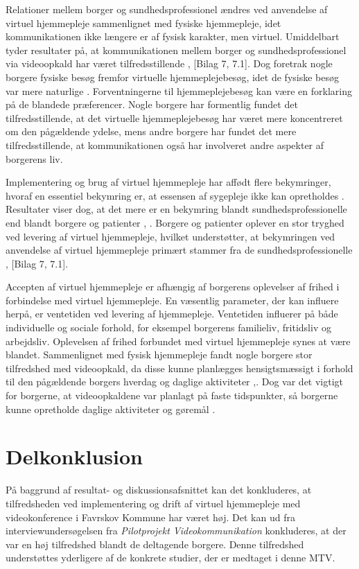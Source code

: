 Relationer mellem borger og sundhedsprofessionel ændres ved anvendelse af virtuel hjemmepleje sammenlignet med fysiske hjemmepleje, idet kommunikationen ikke længere er af fysisk karakter, men virtuel. Umiddelbart tyder resultater på, at kommunikationen mellem borger og sundhedsprofessionel via videoopkald har været tilfredsstillende \cite{Baf2}, [Bilag 7, 7.1]. Dog foretrak nogle borgere fysiske besøg fremfor virtuelle hjemmeplejebesøg, idet de fysiske besøg var mere naturlige \cite{kandidat}. 
Forventningerne til hjemmeplejebesøg kan være en forklaring på de blandede præferencer. Nogle borgere har formentlig fundet det tilfredsstillende, at det virtuelle hjemmeplejebesøg har været mere koncentreret om den pågældende ydelse, mens andre borgere har fundet det mere tilfredsstillende, at kommunikationen også har involveret andre aspekter af borgerens liv.

Implementering og brug af virtuel hjemmepleje har affødt flere bekymringer, hvoraf en essentiel bekymring er, at essensen af sygepleje ikke kan opretholdes \cite{telenursing}. Resultater viser dog, at det mere er en bekymring blandt sundhedsprofessionelle end blandt borgere og patienter \cite{telenursing}, \cite{Mair}. Borgere og patienter oplever en stor tryghed ved levering af virtuel hjemmepleje, hvilket understøtter, at bekymringen ved anvendelse af virtuel hjemmepleje primært stammer fra de sundhedsprofessionelle \cite{Baf2}, [Bilag 7, 7.1]. 

Accepten af virtuel hjemmepleje er afhængig af borgerens oplevelser af frihed i forbindelse med virtuel hjemmepleje. En væsentlig parameter, der kan influere herpå, er ventetiden ved levering af hjemmepleje. Ventetiden influerer på både individuelle og sociale forhold, for eksempel borgerens familieliv, fritidsliv og arbejdsliv. Oplevelsen af frihed forbundet med virtuel hjemmepleje synes at være blandet. Sammenlignet med fysisk hjemmepleje fandt nogle borgere stor tilfredshed med videoopkald, da disse kunne planlægges hensigtsmæssigt i forhold til den pågældende borgers hverdag og daglige aktiviteter \cite{kandidat},\cite{wade}. Dog var det vigtigt for borgerne, at videoopkaldene var planlagt på faste tidspunkter, så borgerne kunne opretholde daglige aktiviteter og gøremål \cite{kandidat}.

\section{Delkonklusion}
På baggrund af resultat- og diskussionsafsnittet kan det konkluderes, at tilfredsheden ved implementering og drift af virtuel hjemmepleje med videokonference i Favrskov Kommune har været høj. Det kan ud fra interviewundersøgelsen fra \textit{Pilotprojekt Videokommunikation} konkluderes, at der var en høj tilfredshed blandt de deltagende borgere. Denne tilfredshed understøttes yderligere af de konkrete studier, der er medtaget i denne MTV.

